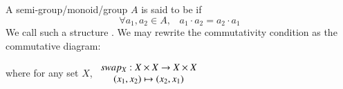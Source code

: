 \documentclass[12pt, a4paper, twoside, openright, titlepage]{book}
\begin{document}
\begin{appendices}
    \begin{defn}{}{}
        A semi-group/monoid/group $A$ is said to be  if \begin{equation}
            \forall a_1,a_2 \in A,\;\;\;a_1\cdot a_2 = a_2\cdot a_1
        \end{equation}
        We call such a structure . We may rewrite the commutativity condition as the commutative diagram:
        \begin{center}
        \end{center}
        where for any set $X$, $\begin{array}{c} swap_X:X\times X\rightarrow X\times X \\ (x_1,x_2)\mapsto (x_2,x_1) \end{array}$
    \end{defn}
\end{appendices}
\end{document}
